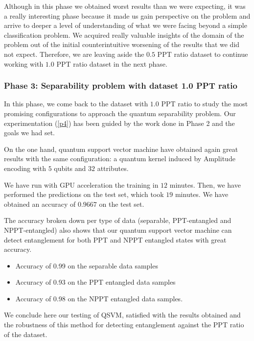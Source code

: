 Although in this phase we obtained worst results than we were expecting, it was a really interesting phase because it made us gain perspective on the problem and arrive to deeper a level of understanding of what we were facing beyond a simple classification problem. We acquired really valuable insights of the domain of the problem out of the initial counterintuitive worsening of the results that we did not expect. Therefore, we are leaving aside the $0.5$ PPT ratio dataset to continue working with $1.0$ PPT ratio dataset in the next phase.


\subsubsection{Phase 3: Separability problem with dataset 1.0 PPT ratio}

In this phase, we come back to the dataset with $1.0$ PPT ratio to study the most promising configurations to approach the quantum separability problem. Our experimentation (\autoref{p4}) has been guided by the work done in Phase 2 and the goals we had set.   

On the one hand, quantum support vector machine have obtained again great results with the same configuration: a quantum kernel induced by Amplitude encoding with $5$ qubits and $32$ attributes.

We have run with GPU acceleration the training in $12$ minutes.
Then, we have performed the predictions on the test set, which took $19$ minutes. We have obtained an accuracy of $0.9667$ on the test set.

The accuracy broken down per type of data (separable, PPT-entangled and NPPT-entangled) also shows that our quantum support vector machine can detect entanglement for both PPT and NPPT entangled states with great accuracy. 
\begin{itemize}
    \item Accuracy of 0.99 on the separable data samples
    \item Accuracy of 0.93 on the PPT entangled data samples
    \item Accuracy of 0.98 on the NPPT entangled data samples.
\end{itemize}

We conclude here our testing of QSVM, satisfied with the results obtained and the robustness of this method for detecting entanglement against the PPT ratio of the dataset.

